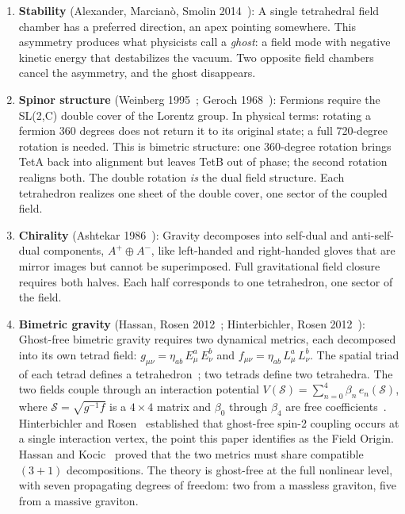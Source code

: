 \documentclass[aps,prd,preprint,superscriptaddress,showpacs,preprintnumbers,amsmath,amssymb,nofootinbib]{revtex4-2}
\begin{document}
\begin{enumerate}
\item \textbf{Stability} (Alexander, Marcian\`o, Smolin 2014~\cite{alexander2014}): A single tetrahedral field chamber has a preferred direction, an apex pointing somewhere. This asymmetry produces what physicists call a \emph{ghost}: a field mode with negative kinetic energy that destabilizes the vacuum. Two opposite field chambers cancel the asymmetry, and the ghost disappears.

\item \textbf{Spinor structure} (Weinberg 1995~\cite{weinberg1995}; Geroch 1968~\cite{geroch1968}): Fermions require the SL(2,C) double cover of the Lorentz group. In physical terms: rotating a fermion 360 degrees does not return it to its original state; a full 720-degree rotation is needed. This is bimetric structure: one 360-degree rotation brings TetA back into alignment but leaves TetB out of phase; the second rotation realigns both. The double rotation \emph{is} the dual field structure. Each tetrahedron realizes one sheet of the double cover, one sector of the coupled field.

\item \textbf{Chirality} (Ashtekar 1986~\cite{ashtekar1986}): Gravity decomposes into self-dual and anti-self-dual components, $A^+ \oplus A^-$, like left-handed and right-handed gloves that are mirror images but cannot be superimposed. Full gravitational field closure requires both halves. Each half corresponds to one tetrahedron, one sector of the field.

\item \textbf{Bimetric gravity} (Hassan, Rosen 2012~\cite{hassan2012}; Hinterbichler, Rosen 2012~\cite{hinterbichler2012}): Ghost-free bimetric gravity requires two dynamical metrics, each decomposed into its own tetrad field: $g_{\mu\nu} = \eta_{ab}\,E^a_\mu\,E^b_\nu$ and $f_{\mu\nu} = \eta_{ab}\,L^a_\mu\,L^b_\nu$. The spatial triad of each tetrad defines a tetrahedron~\cite{barbieri1998}; two tetrads define two tetrahedra. The two fields couple through an interaction potential $V(\mathcal{S}) = \sum_{n=0}^{4} \beta_n\,e_n(\mathcal{S})$, where $\mathcal{S} = \sqrt{g^{-1}f}$ is a $4 \times 4$ matrix and $\beta_0$ through $\beta_4$ are free coefficients~\cite{hassan2012}. Hinterbichler and Rosen~\cite{hinterbichler2012} established that ghost-free spin-2 coupling occurs at a single interaction vertex, the point this paper identifies as the Field Origin. Hassan and Kocic~\cite{hassankocic2018} proved that the two metrics must share compatible $(3{+}1)$ decompositions. The theory is ghost-free at the full nonlinear level, with seven propagating degrees of freedom: two from a massless graviton, five from a massive graviton.
\end{enumerate}
\end{document}
